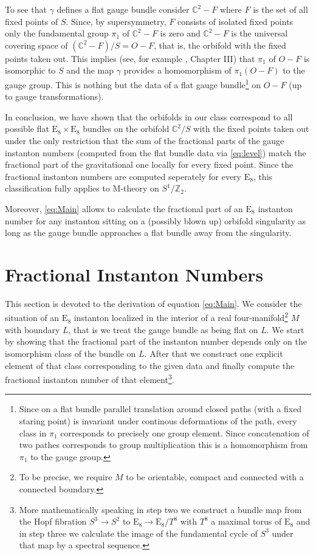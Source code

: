 \documentclass[a4paper,12pt,twoside]{article}
\numberwithin{equation}{section}
\newcommand{\pE}{\text{E}  }     %
\newcommand{\mC}{\mathbb{C}}
\newcommand{\mZ}{\mathbb{Z}}
\newcommand{\lauf}{\longrightarrow}
\begin{document}
To see that $\gamma$ defines a flat gauge bundle consider
$\mC^2-F$ where $F$ is the set of all fixed points of $S$.  Since, by
supersymmetry, $F$ consists of isolated fixed points only the
fundamental group $\pi_1$ of $\mC^2-F$ is zero and $\mC^2-F$ is the
universal covering space of $(\mC^2-F)/S = O-F$, that is, the orbifold
with the fixed points taken out. This implies (see, for example
\cite{Bredon}, Chapter III) that $\pi_1$ of $O-F$ is isomorphic to $S$
and the map $\gamma$ provides a homomorphism of $\pi_1(O-F)$ to the
gauge group.  This is nothing but the data of a flat gauge
bundle\footnote{%
  Since on a flat bundle parallel translation around closed paths
  (with a fixed staring point) is invariant under continous
  deformations of the path, every class in $\pi_1$ corresponds to
  precisely one group element. Since concatenation of two pathes
  corresponds to group multiplication this is a homomorphism from
  $\pi_1$ to the gauge group.} on $O-F$ (up to gauge transformations).

In conclusion, we have shown that the orbifolds in our class
correspond to all possible flat $\pE_8 \times \pE_8$ bundles on the
orbifold $\mC^2/S$ with the fixed points taken out under the only
restriction that the sum of the fractional parts of the gauge
instanton numbers (computed from the flat bundle data via
\eqref{eq:level}) match the fractional part of the gravitational one
locally for every fixed point. Since the fractional instanton numbers
are computed seperately for every $\pE_8$, this classification fully
applies to M-theory on $S^1/\mZ_2$.

Moreover, \eqref{eq:Main} allows to calculate the fractional part of
an $\pE_8$ instanton number for any instanton sitting on a (possibly
blown up) orbifold singularity as long as the gauge bundle approaches
a flat bundle away from the singularity.



\section{Fractional Instanton Numbers}
\label{Calc}


This section is devoted to the derivation of equation \eqref{eq:Main}.
We consider the situation of an $\pE_8$ instanton localized in the
interior of a real four-manifold\footnote{%
  To be precise, we require $M$ to be orientable, compact and
  connected with a connected boundary.  } $M$ with boundary $L$, that
is we treat the gauge bundle as being flat on $L$. We start by showing
that the fractional part of the instanton number depends only on the
isomorphism class of the bundle on $L$. After that we construct one
explicit element of that class corresponding to the given data and
finally compute the fractional instanton number of that
element\footnote{%
  More mathematically speaking in step two we construct a bundle map
  from the Hopf fibration $S^3 \lauf S^2$ to $\pE_8 \lauf \pE_8/T^8$
  with $T^8$ a maximal torus of $\pE_8$ and in step three we calculate
  the image of the fundamental cycle of $S^3$ under that map by a
  spectral sequence.}.
\end{document}
